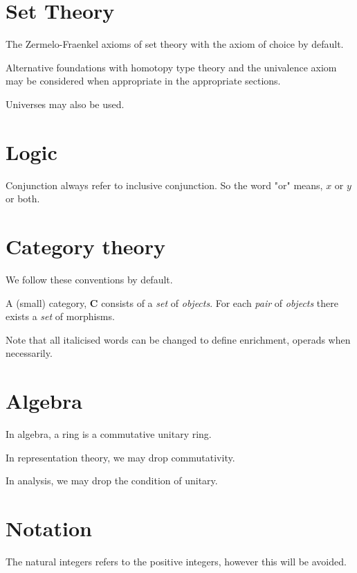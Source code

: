 \section{Set Theory}
\label{section-set-theory}

The Zermelo-Fraenkel axioms of set theory with the axiom of choice by default. 

Alternative foundations with homotopy type theory and the univalence axiom may be considered when appropriate in the appropriate sections.

Universes may also be used.

\section{Logic}

Conjunction always refer to inclusive conjunction. So the word "or" means, $x$ or $y$ or both.

\section{Category theory}
\label{section-category-theory}

We follow these conventions \cite{Stacks} by default.  

\begin{definition}
	A (small) category, $\mathbf{C}$ consists of a \textit{set} of \textit{objects}. For each \textit{pair} of \textit{objects} there exists a \textit{set} of morphisms.
\end{definition}

Note that all italicised words can be changed to define enrichment, operads when necessarily.

\section{Algebra}
\label{section-algebra}

In algebra, a ring is a commutative unitary ring.

In representation theory, we may drop commutativity.

In analysis, we may drop the condition of unitary.

\section{Notation}

The natural integers refers to the positive integers, however this will be avoided.